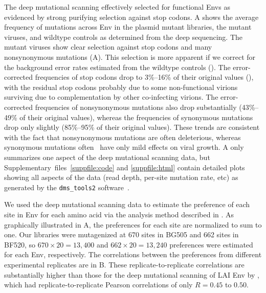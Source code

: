 \documentclass[9pt]{elife}
\begin{document}
The deep mutational scanning effectively selected for functional Envs as evidenced by strong purifying selection against stop codons.
A shows the average frequency of mutations across Env in the plasmid mutant libraries, the mutant viruses, and wildtype controls as determined from the deep sequencing.
The mutant viruses show clear selection against stop codons and many nonsynonymous mutations (A).
This selection is more apparent if we correct for the background error rates estimated from the wildtype controls ().
The error-corrected frequencies of stop codons drop to 3\%--16\% of their original values (), with the residual stop codons probably due to some non-functional virions surviving due to complementation by other co-infecting virions. 
The error-corrected frequencies of nonsynonymous mutations also drop substantially (43\%--49\% of their original values), whereas the frequencies of synonymous mutations drop only slightly (85\%--95\% of their original values).
These trends are consistent with the fact that nonsynonymous mutations are often deleterious, whereas synonymous mutations often~\citep[although certainly not always, see][]{zanini2013quantifying} have only mild effects on viral growth.
A only summarizes one aspect of the deep mutational scanning data, but Supplementary~files~\ref{suppfile:code} and \ref{suppfile:html} contain detailed plots showing all aspects of the data (read depth, per-site mutation rate, etc) as generated by the \texttt{dms\_tools2} software~\citep[\url{https://jbloomlab.github.io/dms_tools2/}]{bloom2015software}.

We used the deep mutational scanning data to estimate the preference of each site in Env for each amino acid via the analysis method described in \citet{bloom2015software}.
As graphically illustrated in A, the preferences for each site are normalized to sum to one.
Our libraries were mutagenized at 670 sites in BG505 and 662 sites in BF520, so $670 \times 20 = 13,400$ and $662 \times 20 = 13,240$ preferences were estimated for each Env, respectively.
The correlations between the preferences from different experimental replicates are in B.
These replicate-to-replicate correlations are substantially higher than those for the deep mutational scanning of LAI Env by \citet{haddox2016experimental}, which had replicate-to-replicate Pearson correlations of only $R = 0.45$ to $0.50$. 
\end{document}
